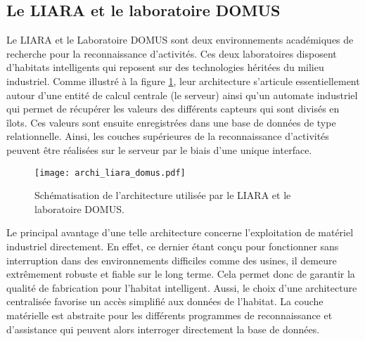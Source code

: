 \subsection{Le \acs{LIARA} et le laboratoire \acs{DOMUS}}

Le \acs{LIARA} \citep{Bouchard2014} et le Laboratoire \acs{DOMUS} \citep{Giroux2009} sont deux environnements académiques de recherche pour la reconnaissance d'activités. Ces deux laboratoires disposent d'habitats intelligents qui reposent sur des technologies héritées du milieu industriel. Comme illustré à la figure \ref{fig:archi_liara_domus}, leur architecture s'articule essentiellement autour d'une entité de calcul centrale (le serveur) ainsi qu'un automate industriel qui permet de récupérer les valeurs des différents capteurs qui sont divisés en îlots. Ces valeurs sont ensuite enregistrées dans une base de données de type relationnelle. Ainsi, les couches supérieures de la reconnaissance d'activités peuvent être réalisées sur le serveur par le biais d'une unique interface.

\begin{figure}[H]
	\centering
	\texttt{[image: archi\_liara\_domus.pdf]}
	\caption{Schématisation de l'architecture utilisée par le \acs{LIARA} et le laboratoire \acs{DOMUS}.}
	\label{fig:archi_liara_domus}
\end{figure}

Le principal avantage d'une telle architecture concerne l'exploitation de matériel industriel directement. En effet, ce dernier étant conçu pour fonctionner sans interruption dans des environnements difficiles comme des usines, il demeure extrêmement robuste et fiable sur le long terme. Cela permet donc de garantir la qualité de fabrication pour l'habitat intelligent. Aussi, le choix d'une architecture centralisée favorise un accès simplifié aux données de l'habitat. La couche matérielle est abstraite pour les différents programmes de reconnaissance et d'assistance qui peuvent alors interroger directement la base de données.

